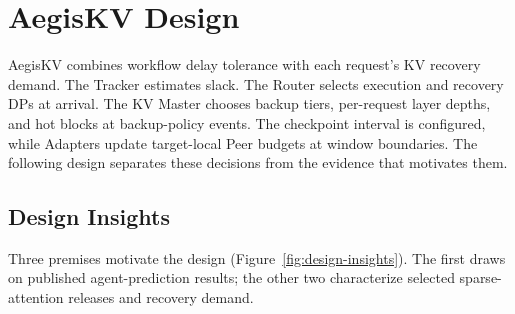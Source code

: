 \section{AegisKV Design}
\label{sec:design}

AegisKV combines workflow delay tolerance with each request's KV
recovery demand. The Tracker estimates slack. The Router selects execution
and recovery DPs at arrival. The KV Master chooses backup tiers,
per-request layer depths, and hot blocks at backup-policy events.
The checkpoint interval is configured, while Adapters update target-local
Peer budgets at window boundaries. The following design
separates these decisions from the evidence that motivates them.

\subsection{Design Insights}
\label{sec:design-insights}

Three premises motivate the design (Figure~\ref{fig:design-insights}).
The first draws on published agent-prediction results; the other two
characterize selected sparse-attention releases and recovery demand.

